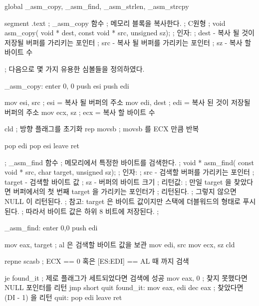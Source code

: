 \begin{AsmCodeListing}[label=memory.asm]
global _asm_copy, _asm_find, _asm_strlen, _asm_strcpy

segment .text
; _asm_copy 함수
; 메모리 블록을 복사한다. 
; C원형
; void asm_copy( void * dest, const void * src, unsigned sz);
; 인자:
;   dest - 복사 될 것이 저장될 버퍼를 가리키는 포인터
;   src  - 복사 될 버퍼를 가리키는 포인터
;   sz   - 복사 할 바이트 수

; 다음으로 몇 가지 유용한 심볼들을 정의하였다. 

_asm_copy:
        enter   0, 0
        push    esi
        push    edi

        mov     esi, src        ; esi = 복사 될 버퍼의 주소 
        mov     edi, dest       ; edi = 복사 된 것이 저장될 버퍼의 주소
        mov     ecx, sz         ; ecx =  복사 할 바이트 수

        cld                     ; 방향 플래그를 초기화
        rep     movsb           ; movsb 를 ECX 만큼 반복

        pop     edi
        pop     esi
        leave
        ret


; _asm_find 함수
; 메모리에서 특정한 바이트를 검색한다. 
; void * asm_find( const void * src, char target, unsigned sz);
; 인자:
;   src    - 검색할 버퍼를 가리키는 포인터
;   target - 검색할 바이트 값
;   sz     - 버퍼의 바이트 크기
; 리턴값:
;   만일 target 을 찾았다면 버퍼에서의 첫 번째 target 을 가리키는 포인터가
;   리턴된다.
;   그렇지 않으면 NULL 이 리턴된다.
; 참고: target 은 바이트 값이지만 스택에 더블워드의 형태로 푸시된다.
;      따라서 바이트 값은 하위 8 비트에 저장된다. 
; 

_asm_find:
        enter   0,0
        push    edi

        mov     eax, target     ; al 은 검색할 바이트 값을 보관
        mov     edi, src
        mov     ecx, sz
        cld

        repne   scasb           ; ECX == 0 혹은 [ES:EDI] == AL 때 까지 검색

        je      found_it        ; 제로 플래그가 세트되었다면 검색에 성공
        mov     eax, 0          ; 찾지 못했다면 NULL 포인터를 리턴
        jmp     short quit
found_it:
        mov     eax, edi          
        dec     eax              ;  찾았다면 (DI - 1) 을 리턴
quit:
        pop     edi
        leave
        ret



\end{AsmCodeListing}
